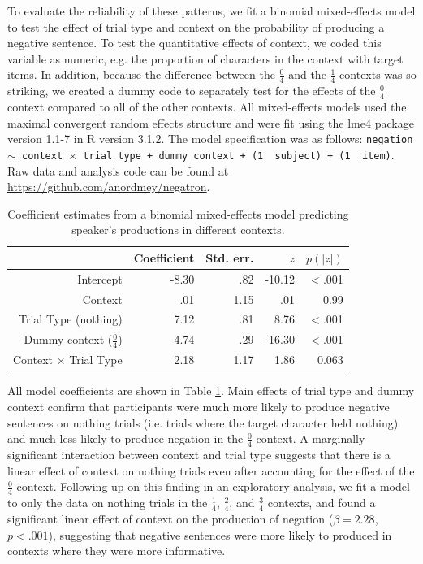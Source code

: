 \documentclass[man, noapacite]{apa2}
\begin{document}
To evaluate the reliability of these patterns, we fit a binomial mixed-effects model to test the effect of trial type and context on the probability of producing a negative sentence.  To test the quantitative effects of context, we coded this variable as numeric, e.g. the proportion of characters in the context with target items.  In addition, because the difference between the  $\frac{0}{4}$ and the  $\frac{1}{4}$ contexts was so striking, we created a dummy code to separately test for the effects of the  $\frac{0}{4}$ context compared to all of the other contexts.  All mixed-effects models used the maximal convergent random effects structure and were fit using the lme4 package version 1.1-7 in R version 3.1.2.  The model specification was as follows: \texttt{negation $\sim$ context~$\times$~trial type + dummy context + (1~\textbar~subject) +  (1~\textbar~item)}.  Raw data and analysis code can be found at \url{https://github.com/anordmey/negatron}.

\begin{table}[t]
\caption{\label{tab:speakermodel} Coefficient estimates from a binomial mixed-effects model predicting speaker's productions in different contexts.}
\begin{center}
\begin{tabular}{rrrrr}
  \hline
 & Coefficient & Std. err. & $z$ & $p(|z|)$ \\ 
  \hline
Intercept & -8.30 & .82 & -10.12 & $<$.001 \\ 
  Context & .01 & 1.15 & .01 &  0.99 \\ 
  Trial Type (nothing) & 7.12 & .81 & 8.76 & $<$.001 \\
  Dummy context ($\frac{0}{4}$) & -4.74& .29 & -16.30 & $<$.001 \\ 
  Context $\times$ Trial Type & 2.18 & 1.17 & 1.86 & 0.063 \\
   \hline
\end{tabular}
\vspace{-1.5cm}
\end{center}
\end{table}

All model coefficients are shown in Table \ref{tab:speakermodel}.  Main effects of trial type and dummy context confirm that participants were much more likely to produce negative sentences on nothing trials (i.e. trials where the target character held nothing) and much less likely to produce negation in the $\frac{0}{4}$ context.  A marginally significant interaction between context and trial type suggests that there is a linear effect of context on nothing trials even after accounting for the effect of the $\frac{0}{4}$ context.  Following up on this finding in an exploratory analysis, we fit a model to only the data on nothing trials in the $\frac{1}{4}$, $\frac{2}{4}$, and $\frac{3}{4}$ contexts, and found a significant linear effect of context on the production of negation ($\beta= 2.28$, $p< .001$), suggesting that negative sentences were more likely to produced in contexts where they were more informative.  
\end{document}
